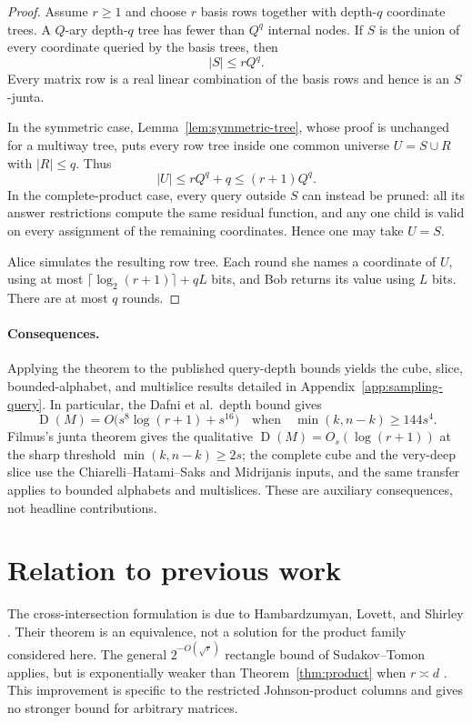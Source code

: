 \documentclass[11pt]{article}
\theoremstyle{definition}
\theoremstyle{remark}
\newcommand{\1}{\mathbf 1}
\newcommand{\Dcc}{\operatorname{D}}
\begin{document}
\begin{proof}
Assume $r\ge1$ and choose $r$ basis rows together with depth-$q$ coordinate
trees.  A $Q$-ary depth-$q$ tree has fewer than $Q^q$ internal nodes.  If $S$
is the union of every coordinate queried by the basis trees, then
\[
 |S|\le rQ^q.
\]
Every matrix row is a real linear combination of the basis rows and hence is
an $S$-junta.

In the symmetric case, Lemma~\ref{lem:symmetric-tree}, whose proof is
unchanged for a multiway tree, puts every row tree inside one common universe
$U=S\cup R$ with $|R|\le q$.  Thus
\[
 |U|\le rQ^q+q\le(r+1)Q^q.
\]
In the complete-product case, every query outside $S$ can instead be pruned:
all its answer restrictions compute the same residual function, and any one
child is valid on every assignment of the remaining coordinates.  Hence one
may take $U=S$.

Alice simulates the resulting row tree.  Each round she names a coordinate
of $U$, using at most
$\lceil\log_2(r+1)\rceil+qL$ bits, and Bob returns its value using $L$ bits.
There are at most $q$ rounds.
\end{proof}


\paragraph{Consequences.}
Applying the theorem to the published query-depth bounds yields the cube,
slice, bounded-alphabet, and multislice results detailed in
Appendix~\ref{app:sampling-query}.  In particular, the Dafni et al.\ depth
bound gives
\[
 \Dcc(M)=O\bigl(s^8\log(r+1)+s^{16}\bigr)
 \quad\text{when}\quad \min(k,n-k)\ge144s^4.
\]
Filmus's junta theorem gives the qualitative
$\Dcc(M)=O_s(\log(r+1))$ at the sharp threshold
$\min(k,n-k)\ge2s$; the complete cube and the very-deep slice use the
Chiarelli--Hatami--Saks and Midrijanis inputs, and the same transfer applies
to bounded alphabets and multislices.  These are auxiliary consequences, not
headline contributions.

\section{Relation to previous work}

The cross-intersection formulation is due to Hambardzumyan, Lovett, and
Shirley \cite{HambardzumyanLovettShirley}.  Their theorem is an equivalence,
not a solution for the product family considered here.  The general
$2^{-O(\sqrt r)}$ rectangle bound of Sudakov--Tomon applies, but is
exponentially weaker than Theorem~\ref{thm:product} when $r\asymp d$
\cite{SudakovTomon}.  This improvement is specific to the restricted
Johnson-product columns and gives no stronger bound for arbitrary matrices.
\end{document}
